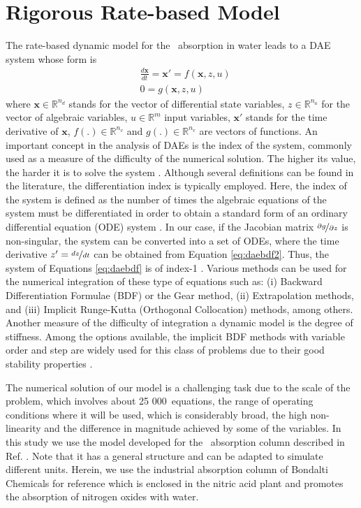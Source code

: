 \documentclass[journal=jacsat,manuscript=article]{achemso}
\newcommand{\nox}{\ce{NO_{\rmfamily{x}}}}
\begin{document}
\section{Rigorous Rate-based Model}

The rate-based dynamic model for the \nox~absorption in water leads to a DAE system whose form is 
\begin{subequations}
	\label{eq:daebdf}
	\begin{align}
	\label{eq:daebdf1}
	&\frac{d\bm{x}}{dt}=\bm{x}'= f(\bm{x},z,u)  \\
	\label{eq:daebdf2}
	&0=g(\bm{x},z,u)  
	\end{align}
\end{subequations}
where $\bm{x}\in \mathbb{R}^{n_d}$ stands for the vector of differential state variables, $z\in \mathbb{R}^{n_a}$ for the vector of algebraic variables, $u\in \mathbb{R}^{m}$ input variables, $\bm{x}'$ stands for the time derivative of $\bm{x}$, $f(.)\in\mathbb{R}^{n_v}$ and $g(.)\in\mathbb{R}^{n_v}$ are vectors of functions.
An important concept in the analysis of DAEs is the index of the system, commonly used as a measure of the difficulty of the numerical solution. The higher its value, the harder it is to solve the system \cite{Blajer1992,Juttner2000}.
Although several definitions can be found in the literature, the differentiation index is typically employed. Here, the index of the system is defined as the number of times the algebraic equations of the system must be differentiated in order to obtain a standard form of an ordinary differential equation (ODE) system \cite{Juttner2000}.
In our case, if the Jacobian matrix $\nicefrac{\partial g}{\partial z}$ is non-singular, the system can be converted into a set of ODEs, where the time derivative $z'=\nicefrac{dz}{dt}$ can be obtained from Equation \eqref{eq:daebdf2}.
Thus, the system of Equations \eqref{eq:daebdf} is of index-1 \cite{Brenan1996a}.
Various methods can be used for the numerical integration of these type of equations such as\cite{Blajer1992, Vilarinho2018}:  (i) Backward Differentiation Formulae (BDF) or the Gear method, (ii) Extrapolation methods, and (iii) Implicit Runge-Kutta (Orthogonal Collocation) methods, among others. Another measure of the difficulty of integration a dynamic model is the degree of stiffness.  Among the options available, the implicit BDF methods with variable order and step are widely used for this class of problems due to their good stability properties \cite{Celaya2014}. 

The numerical solution of our model is a challenging
task due to the scale of the problem, which involves about 25 000~equations, the range of operating conditions where it will be used, which
	is considerably broad, the high non-linearity and the difference in magnitude achieved by some of the
	variables.
In this study we use the model developed for the \nox~absorption column described in Ref. .
Note that it 
has a general structure and can be adapted to simulate
different units. 
Herein, we use the
industrial absorption column of Bondalti Chemicals for reference which is enclosed in the nitric acid
plant and promotes the absorption of nitrogen oxides with water. 
\end{document}
